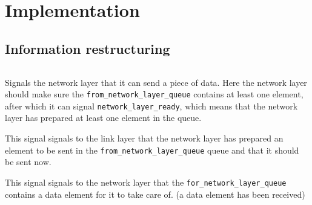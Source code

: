 \section{Implementation}
\subsection{Information restructuring}

\begin{lstlisting}

\end{lstlisting}




\begin{description}[leftmargin=1em, style=nextline]
\item [\texttt{network\_layer\_allowed\_to\_send}] Signals the network layer that it can send a piece of data.
Here the network layer should make sure the \texttt{from\_network\_layer\_queue}
contains at least one element, after which it can signal \texttt{network\_layer\_ready},
which means that the network layer has prepared at least one element in the queue.

\item [\texttt{network\_layer\_ready}] This signal signals to the link layer that the network layer has prepared an element to be sent in the
  \texttt{from\_network\_layer\_queue} queue and that it should be sent now.

\item [\texttt{data\_for\_network\_layer}]
This signal signals to the network layer that the
\texttt{for\_network\_layer\_queue} contains a data element for it to take care of. (a data element has been received)
\end{description}

\hfill \break
